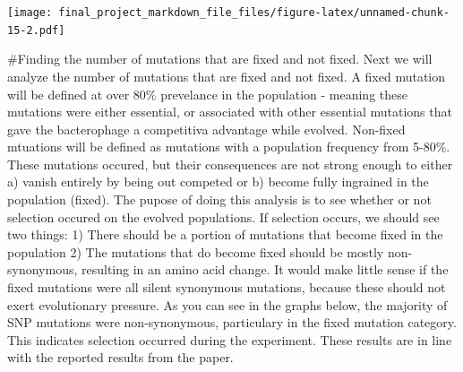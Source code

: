 \documentclass[
]{article}
\newenvironment{Shaded}{\begin{snugshade}}{\end{snugshade}}
\newcommand{\CommentTok}[1]{\textcolor[rgb]{0.56,0.35,0.01}{\textit{#1}}}
\newcommand{\DataTypeTok}[1]{\textcolor[rgb]{0.13,0.29,0.53}{#1}}
\newcommand{\FloatTok}[1]{\textcolor[rgb]{0.00,0.00,0.81}{#1}}
\newcommand{\KeywordTok}[1]{\textcolor[rgb]{0.13,0.29,0.53}{\textbf{#1}}}
\newcommand{\NormalTok}[1]{#1}
\newcommand{\OperatorTok}[1]{\textcolor[rgb]{0.81,0.36,0.00}{\textbf{#1}}}
\newcommand{\StringTok}[1]{\textcolor[rgb]{0.31,0.60,0.02}{#1}}
\begin{document}
\begin{Shaded}
\end{Shaded}

\texttt{[image: final\_project\_markdown\_file\_files/figure-latex/unnamed-chunk-15-2.pdf]}

\#Finding the number of mutations that are fixed and not fixed. Next we
will analyze the number of mutations that are fixed and not fixed. A
fixed mutation will be defined at over 80\% prevelance in the population
- meaning these mutations were either essential, or associated with
other essential mutations that gave the bacterophage a competitiva
advantage while evolved. Non-fixed mtuations will be defined as
mutations with a population frequency from 5-80\%. These mutations
occured, but their consequences are not strong enough to either a)
vanish entirely by being out competed or b) become fully ingrained in
the population (fixed). The pupose of doing this analysis is to see
whether or not selection occured on the evolved populations. If
selection occurs, we should see two things: 1) There should be a portion
of mutations that become fixed in the population 2) The mutations that
do become fixed should be mostly non-synonymous, resulting in an amino
acid change. It would make little sense if the fixed mutations were all
silent synonymous mutations, because these should not exert evolutionary
pressure. As you can see in the graphs below, the majority of SNP
mutations were non-synonymous, particulary in the fixed mutation
category. This indicates selection occurred during the experiment. These
results are in line with the reported results from the paper.
\end{document}
